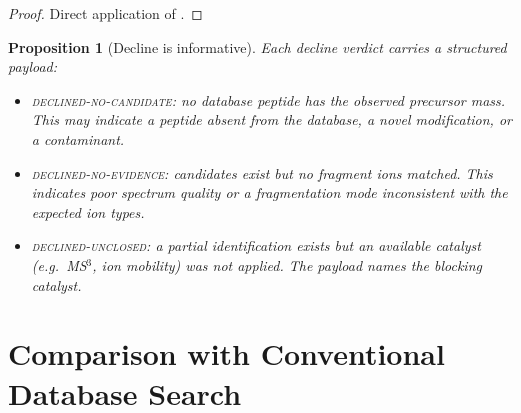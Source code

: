 \documentclass[11pt,a4paper]{article}
\newtheorem{proposition}[theorem]{Proposition}
\theoremstyle{definition}
\theoremstyle{remark}
\begin{document}
\begin{proof}
Direct application of .
\end{proof}

\begin{proposition}[Decline is informative]
\label{prop:decline-informative}
Each decline verdict carries a structured payload:
\begin{itemize}[itemsep=1pt]
  \item \textsc{declined-no-candidate}: no database peptide has the
  observed precursor mass. This may indicate a peptide absent from
  the database, a novel modification, or a contaminant.
  \item \textsc{declined-no-evidence}: candidates exist but no fragment
  ions matched. This indicates poor spectrum quality or a fragmentation
  mode inconsistent with the expected ion types.
  \item \textsc{declined-unclosed}: a partial identification exists but
  an available catalyst (e.g.\ MS$^3$, ion mobility) was not applied.
  The payload names the blocking catalyst.
\end{itemize}
\end{proposition}

\section{Comparison with Conventional Database Search}
\label{sec:comparison}
\end{document}
